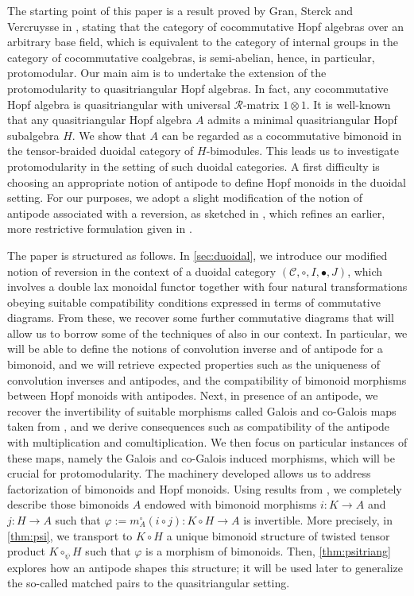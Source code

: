\documentclass[nosumlimits,twoside]{amsart}
\theoremstyle{definition}
\theoremstyle{remark}
\newcommand{\Cc}{\mathcal{C}}
\begin{document}
The starting point of this paper is a result proved by Gran, Sterck and Vercruysse in \cite{GrStVe}, stating that the category of cocommutative Hopf algebras over an arbitrary base field, which is equivalent to the category of internal groups in the category of cocommutative coalgebras, is semi-abelian, hence, in particular, protomodular.
Our main aim is to
undertake the extension of  the protomodularity to quasitriangular Hopf algebras. In fact, any cocommutative Hopf algebra is quasitriangular with universal $\mathcal{R}$-matrix $1\otimes 1$. It is well-known that any quasitriangular Hopf algebra $A$ admits a minimal quasitriangular Hopf subalgebra $H$. We show that $A$ can be regarded as a cocommutative bimonoid in the tensor-braided duoidal category of $H$-bimodules. This leads us to investigate protomodularity in the setting of such duoidal categories. A first difficulty is choosing an appropriate notion of antipode to define Hopf monoids in the duoidal setting. For our purposes, we adopt a slight modification of the notion of antipode associated with a reversion, as sketched in \cite{Bohm-Canada}, which refines an earlier, more restrictive formulation given in \cite{Bohm-Lack}. 

The paper is structured as follows. In \cref{sec:duoidal}, we introduce our modified notion of reversion in the context of a duoidal category $(\Cc,\circ, I,\bullet,J)$, which involves a double lax monoidal functor together with four natural transformations obeying suitable compatibility conditions expressed in terms of commutative diagrams. From these, we recover some further commutative diagrams that will allow us to borrow some of the techniques of \cite{Bohm-Lack} also in our context. In particular, we will be able to define the notions of convolution inverse and of antipode for a bimonoid, and we will retrieve expected properties such as the uniqueness of convolution inverses and antipodes, and the compatibility of bimonoid morphisms between Hopf monoids with antipodes. Next, in presence of an antipode, we recover the invertibility of suitable morphisms  called Galois and co-Galois maps taken from \cite{Bohm-Lack}, and we derive consequences such as compatibility of the antipode with multiplication and comultiplication. We then focus on particular instances of these maps, namely the Galois and co-Galois induced morphisms, which will be crucial for protomodularity.  The machinery developed allows us to address factorization of bimonoids and Hopf monoids. Using results from \cite{BD-CrossII}, we completely describe those bimonoids $A$ endowed with bimonoid morphisms $i:K\to A$ and $j:H\to A$ such that $\varphi:=m_A^\circ(i\circ j):K\circ H\to A$ is invertible. More precisely, in \cref{thm:psi}, we transport to $K\circ H$ a unique bimonoid structure of twisted tensor product $K\circ_\psi H$ such that $\varphi$ is a morphism of bimonoids. Then, \cref{thm:psitriang} explores how an antipode shapes this structure; it will be used later to generalize the so-called matched pairs to the quasitriangular setting.
\end{document}
